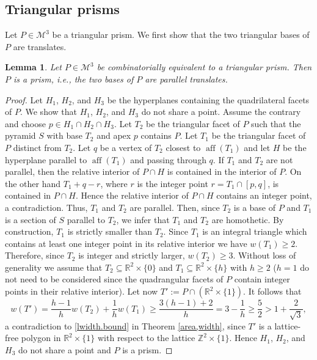 \documentclass[a4paper]{article}
\theoremstyle{plain}
\newtheorem{lemma}[nn]{Lemma}
\begin{document}
\subsection{Triangular prisms}

Let $P \in {\mathcal{M}^3}$ be a triangular prism.
We first show that the two triangular bases of $P$ are
translates.

\begin{lemma} \label{shape.prism}
Let $P \in {\mathcal{M}^3}$ be combinatorially equivalent to a triangular
prism.
Then $P$ is a prism, i.e., the two bases of $P$ are parallel
translates.
\end{lemma}

\begin{proof}
Let $H_1$, $H_2$, and $H_3$ be the hyperplanes containing
the quadrilateral facets of $P$.
We show that $H_1$, $H_2$, and $H_3$ do not share a point.
Assume the contrary and choose $p \in H_1 \cap H_2 \cap
H_3$.
Let $T_2$ be the triangular facet of $P$ such that the
pyramid $S$ with base $T_2$ and apex $p$ contains $P$.
Let $T_1$ be the triangular facet of $P$ distinct from
$T_2$.
Let $q$ be a vertex of $T_2$ closest to ${{\mathop{\mathrm{{aff}}}}}(T_1)$ and let
$H$ be the hyperplane parallel to ${{\mathop{\mathrm{{aff}}}}}(T_1)$ and passing
through $q$.
If $T_1$ and $T_2$ are not parallel, then the relative
interior of $P \cap H$ is contained in the interior of $P$.
On the other hand $T_1 + q - r$, where $r$ is the integer
point $r = T_1 \cap [p,q]$, is contained in $P \cap H$.
Hence the relative interior of $P \cap H$ contains an
integer point, a contradiction.
Thus, $T_1$ and $T_2$ are parallel.
Then, since $T_2$ is a base of $P$ and $T_1$ is a section of
$S$ parallel to $T_2$, we infer that $T_1$ and $T_2$ are
homothetic.
By construction, $T_1$ is strictly smaller than $T_2$.
Since $T_1$ is an integral triangle which contains at least
one integer point in its relative interior we have $w(T_1)
\geq 2$.
Therefore, since $T_2$ is integer and strictly larger,
$w(T_2) \geq 3$.
Without loss of generality we assume that $T_2 \subseteq
{\mathbb{R}}^2 \times \{0\}$ and $T_1 \subseteq {\mathbb{R}}^2 \times \{h\}$
with $h \ge 2$ ($h = 1$ do not need to be considered since
the quadrangular facets of $P$ contain integer points in
their relative interior).
Let now $T':= P \cap ({\mathbb{R}}^2 \times \{1\})$.
It follows that
\[ w(T') = \frac{h-1}{h} w(T_2) + \frac{1}{h} w(T_1) \ge
\frac{3(h-1)+2}{h} = 3 - \frac{1}{h} \ge \frac{5}{2} > 1 +
\frac{2}{\sqrt{3}},\]
a contradiction to \eqref{lwidth.bound} in Theorem
\ref{area,width}, since $T'$ is a lattice-free polygon in
${\mathbb{R}}^2 \times \{1\}$ with respect to the lattice ${\mathbb{Z}}^2 \times
\{1\}$.
Hence $H_1$, $H_2$, and $H_3$ do not share a point and $P$
is a prism.
\end{proof}
\end{document}
